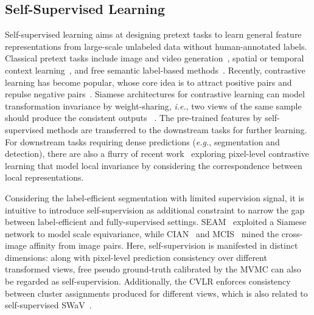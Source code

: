\documentclass[twocolumn]{svjour3}          \smartqed  \usepackage{graphicx}
\newcommand{\prelim}[1]{{#1}}
\begin{document}
\subsection{Self-Supervised Learning}
\prelim{
Self-supervised learning aims at designing pretext tasks to learn general feature representations from large-scale unlabeled data without human-annotated labels.
Classical pretext tasks include image and video generation~\citep{PathakKDDE16:context,LedigTHCCAATTWS17:PhotoRealistic}, spatial or temporal context learning~\citep{DoerschGE15:contextPred,LeeHS017:sortingSeq}, and free semantic label-based methods~\citep{StretcuL15:mfmodv}.
Recently, contrastive learning has become popular, whose core idea is to attract positive pairs and repulse negative pairs~\citep{ChenK0H20:SimCLR,He0WXG20:moco}.
Siamese architectures for contrastive learning can model transformation invariance by weight-sharing, \textit{i.e.}, two views of the same sample should produce the consistent outputs ~\citep{Xinlei:SimSiam}.
The pre-trained features by self-supervised methods are transferred to the downstream tasks for further learning.
For downstream tasks requiring dense predictions (\textit{e.g.}, segmentation and detection), there are also a flurry of recent work~\citep{Xie_2021_ICCV:DetCo,XieL00L021:PixPro,WangZSKL21:DenseCL,PinheiroABGC20:VADeR} exploring pixel-level contrastive learning that model local invariance by considering the correspondence between local representations.
}

\prelim{
Considering the label-efficient segmentation with limited supervision signal, it is intuitive to introduce self-supervision as additional constraint to narrow the gap between label-efficient and fully-supervised settings.
SEAM~\citep{WangZKSC20:SEAM} exploited a Siamese network to model scale equivariance, while CIAN~\citep{FanZTSX20:cian} and MCIS~\citep{SunWDG20:MCIS} mined the cross-image affinity from image pairs.
Here, self-supervision is manifested in distinct dimensions: along with pixel-level prediction consistency over different transformed views, free pseudo ground-truth calibrated by the MVMC can also be regarded as self-supervision.
Additionally, the CVLR enforces consistency between cluster assignments produced for different views, which is also related to self-supervised SWaV~\citep{CaronMMGBJ20:SWaV}.
}
\end{document}
